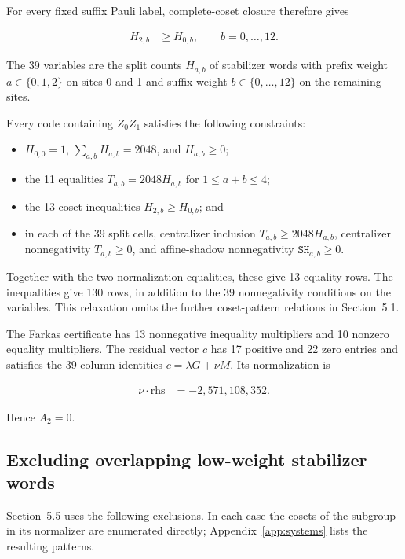 \documentclass[11pt]{article}
\newcommand{\rhs}{\mathrm{rhs}}
\begin{document}
For every fixed suffix Pauli label, complete-coset closure therefore gives

\[
\begin{aligned}
H_{2,b} &\geq H_{0,b},\qquad b=0,\dots,12.
\end{aligned}
\]

The 39 variables are the split counts \(H_{a,b}\) of stabilizer words with prefix weight \(a\in\{0,1,2\}\) on sites 0 and 1 and suffix weight \(b\in\{0,\ldots,12\}\) on the remaining sites.

Every code containing \(Z_0Z_1\) satisfies the following constraints:

\begin{itemize}
\item \(H_{0,0}=1\), \(\sum_{a,b}H_{a,b}=2048\), and \(H_{a,b}\geq0\);
\item the 11 equalities \(T_{a,b}=2048H_{a,b}\) for \(1\leq a+b\leq4\);
\item the 13 coset inequalities \(H_{2,b}\geq H_{0,b}\); and
\item in each of the 39 split cells, centralizer inclusion \(T_{a,b}\geq2048H_{a,b}\), centralizer nonnegativity \(T_{a,b}\geq0\), and affine-shadow nonnegativity \(\mathtt{SH}_{a,b}\geq0\).
\end{itemize}

Together with the two normalization equalities, these give 13 equality rows. The inequalities give 130 rows, in addition to the 39 nonnegativity conditions on the variables. This relaxation omits the further coset-pattern relations in Section~5.1.

The Farkas certificate has 13 nonnegative inequality multipliers and 10 nonzero equality multipliers. The residual vector \(c\) has 17 positive and 22 zero entries and satisfies the 39 column identities \(c=\lambda G+\nu M\). Its normalization is

\[
\begin{aligned}
\nu \cdot \rhs &=-2{,}571{,}108{,}352.
\end{aligned}
\]

Hence \(A_{2}=0\).

\subsection{Excluding overlapping low-weight stabilizer words}\label{excluding-overlapping-low-weight-checks}

Section~5.5 uses the following exclusions. In each case the cosets of the subgroup in its normalizer are enumerated directly; Appendix~\ref{app:systems} lists the resulting patterns.
\end{document}

